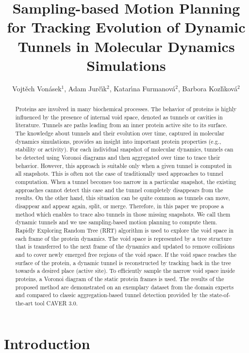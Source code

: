 \documentclass[usletter, 10pt, conference]{svjour3}      %
\title{
    Sampling-based Motion Planning for Tracking Evolution of Dynamic Tunnels in Molecular Dynamics Simulations
}
\author{Vojt\v ech Von\' asek$^{1}$, Adam Jur\v{c}\'\i k$^{2}$, Katar\'\i na Furmanov\'a$^{2}$, Barbora Kozl\'\i kov\'a$^{2}$}
\institute{
{$^{1}$vonasek@labe.felk.cvut.cz;
Faculty of Electrical Engineering,  
Czech Technical University in Prague, 
Technick\'a 2, 166 27, Prague 6, Czech Republic}%
\and
$^{2}$ Faculty of Informatics,  
Masaryk University, 
Botanick\'a 68a, 602 00 Brno,
Czech Republic
}
\begin{document}
\maketitle


\begin{abstract}
Proteins are involved in many biochemical processes.
The behavior of proteins is highly influenced by the presence of internal void space, denoted as tunnels or cavities in literature.
Tunnels are paths leading from an inner protein active site to its surface.
The knowledge about tunnels and their evolution over time, captured in molecular dynamics simulations, provides an insight into important protein properties
(e.g., stability or activity).
For each individual snapshot of molecular dynamics, tunnels can be detected using Voronoi diagrams and then aggregated over time to trace their behavior.
However, this approach is suitable only when a given tunnel is computed in all snapshots.
This is often not the case of traditionally used approaches to tunnel computation.
When a tunnel becomes too narrow in a particular snapshot, the existing approaches cannot detect this case and the tunnel completely disappears from the results.
On the other hand, this situation can be quite common as tunnels can move, disappear and appear again, split, or merge.
Therefore, in this paper we propose a method which enables to trace also tunnels in those missing snapshots.
We call them dynamic tunnels and we use sampling-based motion planning to compute them.
Rapidly Exploring Random Tree (RRT) algorithm is used to explore the void space in each frame of the protein dynamics.
The void space is represented by a tree structure that is transferred to the next frame of the dynamics and updated to remove collisions and to cover newly emerged free regions of the void space.
If the void space reaches the surface of the protein, a dynamic tunnel is reconstructed by tracking back in the tree towards a desired place (active site).
To efficiently sample the narrow void space inside proteins, a Voronoi diagram of the static protein frames is used.
The results of the proposed method are demonstrated on an exemplary dataset from the domain experts and compared to classic aggregation-based tunnel detection
provided by the state-of-the-art tool CAVER 3.0.
\end{abstract}



\section{Introduction}
\end{document}
